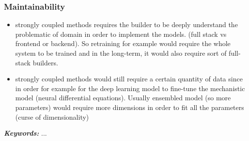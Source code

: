 \subsubsection{Maintainability}

    \begin{itemize}
        \item strongly coupled methods requires the builder to be deeply understand the problematic of domain in order to implement the models. (full stack vs frontend or backend). So retraining for example would require the whole system to be trained and in the long-term, it would also require sort of full-stack builders. 
        
        \item strongly coupled methods would still require a  certain quantity of data since in order for example for the deep learning model to fine-tune the mechanistic model (neural differential equations). Usually ensembled model (so more parameters) would require more dimensions in order to fit all the parameters (curse of dimensionality)
    \end{itemize}



\textit{\textbf{Keywords:}} ...



\clearpage 


